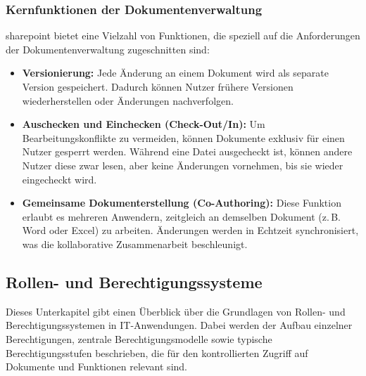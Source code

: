 \subsubsection{Kernfunktionen der Dokumentenverwaltung}

\gls{sharepoint} bietet eine Vielzahl von Funktionen, die speziell auf die Anforderungen
der Dokumentenverwaltung zugeschnitten sind:

\begin{itemize}

    \item \textbf{Versionierung:}
          Jede Änderung an einem Dokument wird als separate Version gespeichert.
          Dadurch können Nutzer frühere Versionen wiederherstellen oder Änderungen
          nachverfolgen. \cite{microsoft_sharepoint_support,kampffmeyer2006ecm}

    \item \textbf{Auschecken und Einchecken (Check-Out/In):}
          Um Bearbeitungskonflikte zu vermeiden, können Dokumente exklusiv für einen
          Nutzer gesperrt werden. Während eine Datei ausgecheckt ist, können andere
          Nutzer diese zwar lesen, aber keine Änderungen vornehmen, bis sie wieder
          eingecheckt wird. \cite{microsoft_sharepoint_support}

    \item \textbf{Gemeinsame Dokumenterstellung (Co-Authoring):}
          Diese Funktion erlaubt es mehreren Anwendern, zeitgleich an demselben
          Dokument (z.\,B. Word oder Excel) zu arbeiten. Änderungen werden in
          Echtzeit synchronisiert, was die kollaborative Zusammenarbeit beschleunigt.
          \cite{microsoft_sharepoint_support}

\end{itemize}
\subsection{Rollen- und Berechtigungssysteme}

Dieses Unterkapitel gibt einen Überblick über die Grundlagen von Rollen- und
Berechtigungssystemen in IT-Anwendungen. Dabei werden der Aufbau einzelner
Berechtigungen, zentrale Berechtigungsmodelle sowie typische
Berechtigungsstufen beschrieben, die für den kontrollierten Zugriff auf
Dokumente und Funktionen relevant sind.

